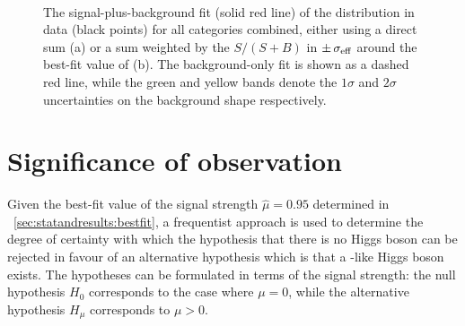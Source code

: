 \begin{figure}[hpt!]
\label{fig:statandresults:s_b_fits_bis}
\end{figure}

\begin{figure}[hpt!]
\centering
{}\\
\caption{The signal-plus-background fit (solid red line) of the \mgg distribution in data (black points) for all categories combined, either using a direct sum (a) or a sum weighted by the $S/(S+B)$ in $\pm \,\sigma_{\text{eff}}$ around the best-fit value of \mH (b). The background-only fit is shown as a dashed red line, while the green and yellow bands denote the $1\sigma$ and $2\sigma$ uncertainties on the background shape respectively.}

\label{fig:statandresults:s_b_fits_sum}
\end{figure}


\section{Significance of observation}
\label{sec:statandresults:significance}

Given the best-fit value of the signal strength $\hat{\mu}= 0.95$ determined in \Sec~\ref{sec:statandresults:bestfit}, a frequentist approach is used to determine the degree of certainty with which the hypothesis that there is no Higgs boson can be rejected in favour of an alternative hypothesis which is that a \SM-like Higgs boson exists. The hypotheses can be formulated in terms of the signal strength: the null hypothesis $H_{0}$ corresponds to the case where $\mu=0$, while the alternative hypothesis $H_{\mu}$ corresponds to $\mu > 0$. 

